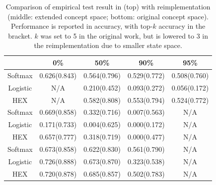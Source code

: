 \documentclass[11pt,a4paper]{article}
\begin{document}
\begin{table}[htbp]
\centering
\begin{tabular}{c|c|c|c|c}
 & 0\% & 50\% & 90\% & 95\%\\
\hline
Softmax & 0.626(0.843) & 0.564(0.796) & 0.529(0.772) & 0.508(0.760)\\
Logistic & N/A & 0.210(0.452) & 0.093(0.272) & 0.056(0.172)\\
HEX & N/A & 0.582(0.808) & 0.553(0.794) & 0.524(0.772)\\
\hline
Softmax & 0.669(0.858) & 0.332(0.716) & 0.007(0.563) & N/A\\
Logistic & 0.171(0.733) & 0.004(0.625) & 0.000(0.172) & N/A\\
HEX & 0.657(0.777) & 0.318(0.719) & 0.000(0.477) & N/A\\
\hline
Softmax & 0.673(0.858) & 0.622(0.830) & 0.561(0.790) & N/A\\
Logistic & 0.726(0.888) & 0.673(0.870) & 0.323(0.538) & N/A\\
HEX & 0.720(0.878) & 0.685(0.857) & 0.502(0.783) & N/A
\end{tabular}
\caption{Comparison of empirical test result in \cite{deng2014large} (top) with reimplementation (middle: extended concept space; bottom: original concept space). Performance is reported in accuracy, with top-$k$ accuracy in the bracket. $k$ was set to 5 in the original work, but is lowered to 3 in the reimplementation due to smaller state space.}
\label{tab:original}
\end{table}
\end{document}
